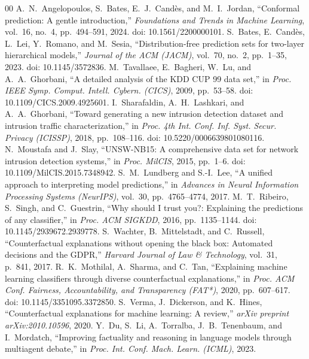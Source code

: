 \documentclass{ieeeaccess}
\begin{document}
\begin{thebibliography}{00}
 A.~N.~Angelopoulos, S.~Bates, E.~J.~Cand{\`e}s, and M.~I.~Jordan, ``Conformal prediction: A gentle introduction,'' \textit{Foundations and Trends in Machine Learning}, vol.~16, no.~4, pp.~494--591, 2024. doi: 10.1561/2200000101.
 S.~Bates, E.~Cand{\`e}s, L.~Lei, Y.~Romano, and M.~Sesia, ``Distribution-free prediction sets for two-layer hierarchical models,'' \textit{Journal of the ACM (JACM)}, vol.~70, no.~2, pp.~1--35, 2023. doi: 10.1145/3572836.
 M.~Tavallaee, E.~Bagheri, W.~Lu, and A.~A.~Ghorbani, ``A detailed analysis of the KDD CUP 99 data set,'' in \textit{Proc. IEEE Symp. Comput. Intell. Cybern. (CICS)}, 2009, pp.~53--58. doi: 10.1109/CICS.2009.4925601.
 I.~Sharafaldin, A.~H.~Lashkari, and A.~A.~Ghorbani, ``Toward generating a new intrusion detection dataset and intrusion traffic characterization,'' in \textit{Proc. 4th Int. Conf. Inf. Syst. Secur. Privacy (ICISSP)}, 2018, pp.~108--116. doi: 10.5220/0006639801080116.
 N.~Moustafa and J.~Slay, ``UNSW-NB15: A comprehensive data set for network intrusion detection systems,'' in \textit{Proc. MilCIS}, 2015, pp.~1--6. doi: 10.1109/MilCIS.2015.7348942.
 S.~M.~Lundberg and S.-I.~Lee, ``A unified approach to interpreting model predictions,'' in \textit{Advances in Neural Information Processing Systems (NeurIPS)}, vol.~30, pp.~4765--4774, 2017.
 M.~T.~Ribeiro, S.~Singh, and C.~Guestrin, ``Why should I trust you?: Explaining the predictions of any classifier,'' in \textit{Proc. ACM SIGKDD}, 2016, pp.~1135--1144. doi: 10.1145/2939672.2939778.
 S.~Wachter, B.~Mittelstadt, and C.~Russell, ``Counterfactual explanations without opening the black box: Automated decisions and the GDPR,'' \textit{Harvard Journal of Law \& Technology}, vol.~31, p.~841, 2017.
 R.~K.~Mothilal, A.~Sharma, and C.~Tan, ``Explaining machine learning classifiers through diverse counterfactual explanations,'' in \textit{Proc. ACM Conf. Fairness, Accountability, and Transparency (FAT*)}, 2020, pp.~607--617. doi: 10.1145/3351095.3372850.
 S.~Verma, J.~Dickerson, and K.~Hines, ``Counterfactual explanations for machine learning: A review,'' \textit{arXiv preprint arXiv:2010.10596}, 2020.
 Y.~Du, S.~Li, A.~Torralba, J.~B.~Tenenbaum, and I.~Mordatch, ``Improving factuality and reasoning in language models through multiagent debate,'' in \textit{Proc. Int. Conf. Mach. Learn. (ICML)}, 2023.

\end{thebibliography}
\end{document}
